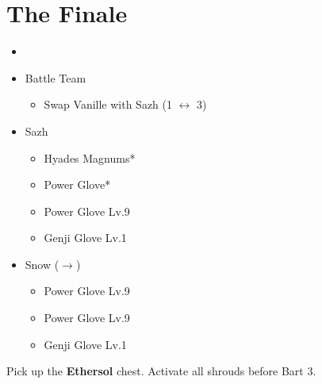 \chapter{The Finale}

\begin{menu}
	\begin{itemize}
	\paradigm
		\begin{itemize}
			\item {}%
				{\paradigmline{\rav}{(\rav)}{\rav}}%
				{\paradigmline{\com}{\com}{\com}}%
				{\paradigmline{\sab}{(\rav)}{\rav}}%
				{\paradigmline[4]{(\med)}{(\com)}{(\com)}}%
				{\paradigmline{\med}{(\sen)}{\syn}}%
				{\paradigmline{(\rav)}{(\rav)}{(\syn)}}%
			\item Battle Team
				\begin{itemize}
					\item Swap Vanille with Sazh (1 $\leftrightarrow$ 3)
				\end{itemize}
		\end{itemize}
	\equip
		\begin{itemize}
			\item Sazh
				\begin{itemize}
					\item Hyades Magnums*
					\item Power Glove*
					\item Power Glove Lv.9
					\item Genji Glove Lv.1
				\end{itemize}
			\item Snow ($\rightarrow$)
				\begin{itemize}
					\item Power Glove Lv.9
					\item Power Glove Lv.9
					\item Genji Glove Lv.1
				\end{itemize}
		\end{itemize}
	\end{itemize}
\end{menu}

\renewcommand{\first}{[1] Tri-Disaster (\rav/\rav/\rav)}
\renewcommand{\second}{[2] Cerberus (\com/\com/\com)}
\renewcommand{\third}{[3] Smart Bomb (\rav/\rav/\sab)}
\renewcommand{\fourth}{[4] Tireless Charge (\com/\com/\med)}
\renewcommand{\fifth}{[5] Protection (\syn/\sen/\med)}
\renewcommand{\sixth}{[6] Malevolence (\syn/\rav/\rav)}

Pick up the \textbf{Ethersol} chest.
Activate all shrouds before Bart 3.

